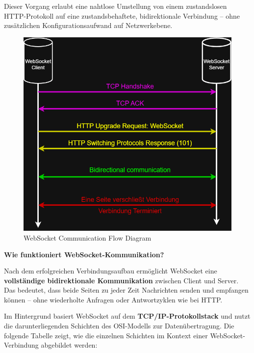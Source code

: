 Dieser Vorgang erlaubt eine nahtlose Umstellung von einem zustandslosen HTTP-Protokoll auf eine zustandsbehaftete, bidirektionale Verbindung – ohne zusätzlichen Konfigurationsaufwand auf Netzwerkebene.

\begin{figure}[H]
  \centering
  \begin{minipage}[b]{0.82\textwidth}
    \centering
    \includegraphics[width=\textwidth]{images/websocketflow.png}
  \end{minipage}
  \hspace{0.05\textwidth}
  \caption{WebSocket Communication Flow Diagram}
  \label{fig:WebSocket Flow Diagram}
\end{figure}
\vspace{1em}

{\large \textbf{Wie funktioniert WebSocket-Kommunikation?}}

Nach dem erfolgreichen Verbindungsaufbau ermöglicht WebSocket eine \textbf{vollständige bidirektionale Kommunikation} zwischen Client und Server. Das bedeutet, dass beide Seiten zu jeder Zeit Nachrichten senden und empfangen können – ohne wiederholte Anfragen oder Antwortzyklen wie bei HTTP.

Im Hintergrund basiert WebSocket auf dem \textbf{TCP/IP-Protokollstack} und nutzt die darunterliegenden Schichten des OSI-Modells zur Datenübertragung. Die folgende Tabelle zeigt, wie die einzelnen Schichten im Kontext einer WebSocket-Verbindung abgebildet werden:

